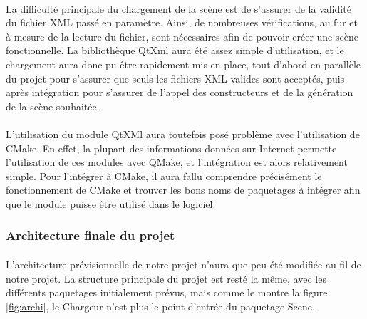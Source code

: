 \paragraph{}
La difficulté principale du chargement de la scène est de s'assurer de la validité du fichier XML passé en paramètre. Ainsi, de nombreuses vérifications, au fur et à mesure de la lecture du fichier, sont nécessaires afin de pouvoir créer une scène fonctionnelle. La bibliothèque QtXml aura été assez simple d'utilisation, et le chargement aura donc pu être rapidement mis en place, tout d'abord en parallèle du projet pour s'assurer que seuls les fichiers XML valides sont acceptés, puis après intégration pour s'assurer de l'appel des constructeurs et de la génération de la scène souhaitée.

\paragraph{}
L'utilisation du module QtXMl aura toutefois posé problème avec l'utilisation de CMake. En effet, la plupart des informations données sur Internet permette l'utilisation de ces modules avec QMake, et l'intégration est alors relativement simple. Pour l'intégrer à CMake, il aura fallu comprendre précisément le fonctionnement de CMake et trouver les bons noms de paquetages à intégrer afin que le module puisse être utilisé dans le logiciel.

\subsubsection{Architecture finale du projet}
\paragraph{}
L'architecture prévisionnelle de notre projet n'aura que peu été modifiée au fil de notre projet. La structure principale du projet est resté la même, avec les différents paquetages initialement prévus, mais comme le montre la figure \ref{fig:archi}, le Chargeur n'est plus le point d'entrée du paquetage Scene.

